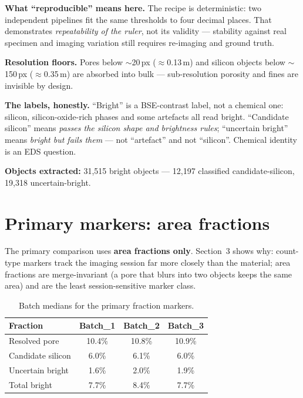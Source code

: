 \documentclass[10pt,a4paper]{article}
\begin{document}
\textbf{What ``reproducible'' means here.} The recipe is deterministic:
two independent pipelines fit the same thresholds to four decimal
places. That demonstrates \emph{repeatability of the ruler}, not its
validity --- stability against real specimen and imaging variation still
requires re-imaging and ground truth.

\textbf{Resolution floors.} Pores below $\sim$20\,px ($\approx$0.13\,\textmu m)
and silicon objects below $\sim$150\,px ($\approx$0.35\,\textmu m) are
absorbed into bulk --- sub-resolution porosity and fines are invisible by
design.

\textbf{The labels, honestly.} ``Bright'' is a BSE-contrast label, not a
chemical one: silicon, silicon-oxide-rich phases and some artefacts all
read bright. ``Candidate silicon'' means \emph{passes the silicon shape
and brightness rules}; ``uncertain bright'' means \emph{bright but fails
them} --- not ``artefact'' and not ``silicon''. Chemical identity is an
EDS question.

\textbf{Objects extracted:} 31,515 bright objects
--- 12,197 classified candidate-silicon,
19,318 uncertain-bright.

\section{Primary markers: area fractions}
\label{sec:primary}

The primary comparison uses \textbf{area fractions only}. Section~3
shows why: count-type markers track the imaging session far more closely
than the material; area fractions are merge-invariant (a pore that blurs
into two objects keeps the same area) and are the least session-sensitive
marker class.

\begin{table}[H]\centering\small
\caption{Batch medians for the primary fraction markers.}
\begin{tabular}{l c c c}
\toprule
Fraction & Batch\_1 & Batch\_2 & Batch\_3 \\
\midrule
Resolved pore & 10.4\% & 10.8\% & 10.9\% \\
Candidate silicon & 6.0\% & 6.1\% & 6.0\% \\
Uncertain bright & 1.6\% & 2.0\% & 1.9\% \\
Total bright & 7.7\% & 8.4\% & 7.7\% \\
\bottomrule
\end{tabular}
\end{table}
\end{document}
